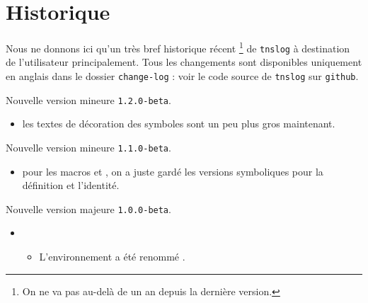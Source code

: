 \documentclass[12pt,a4paper]{article}
\begin{document}
\newpage

\section{Historique}

Nous ne donnons ici qu'un très bref historique récent
\footnote{
	On ne va pas au-delà de un an depuis la dernière version.
}
de \verb+tnslog+ à destination de l'utilisateur principalement.
Tous les changements sont disponibles uniquement en anglais dans le dossier \verb+change-log+ : voir le code source de \verb+tnslog+ sur \verb+github+.

\begin{description}

    \medskip
    \item[2021-03-22] Nouvelle version mineure \verb+1.2.0-beta+.
    
    \begin{itemize}[itemsep=.5em]
        \item {}
              les textes de décoration des symboles sont un peu plus gros maintenant.
    \end{itemize}
    
    
    \separation


    \medskip
    \item[2021-03-04] Nouvelle version mineure \verb+1.1.0-beta+.
    
    \begin{itemize}[itemsep=.5em]
        \item {}
              pour les macros  et , on a juste gardé les versions symboliques pour la définition et l'identité.
    \end{itemize}
    
    
    \separation


    \medskip
    \item[2021-03-01] Nouvelle version majeure \verb+1.0.0-beta+.
    
    \begin{itemize}[itemsep=.5em]
        \item {}
        \begin{itemize}[itemsep=.5em]
            \item L'environnement  a été renommé .
    

\end{itemize}
\end{itemize}
\end{description}
\end{document}
